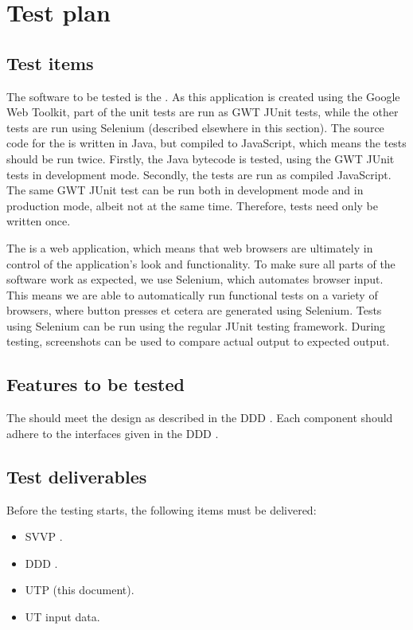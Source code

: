\chapter{Test plan}\label{chap:testPlan}

\section{Test items}
The software to be tested is the \applicationname{}. As this application is created using the Google Web Toolkit, part of the unit tests are run as GWT JUnit tests, while the other tests are run using Selenium (described elsewhere in this section). The source code for the \applicationname{} is written in Java, but compiled to JavaScript, which means the tests should be run twice. Firstly, the Java bytecode is tested, using the GWT JUnit tests in development mode. Secondly, the tests are run as compiled JavaScript. The same GWT JUnit test can be run both in development mode and in production mode, albeit not at the same time. Therefore, tests need only be written once.

The \applicationname{} is a web application, which means that web browsers are ultimately in control of the application's look and functionality. To make sure all parts of the software work as expected, we use Selenium, which automates browser input. This means we are able to automatically run functional tests on a variety of browsers, where button presses et cetera are generated using Selenium. Tests using Selenium can be run using the regular JUnit testing framework. During testing, screenshots can be used to compare actual output to expected output.

\section{Features to be tested}
The \applicationname{} should meet the design as described in the DDD \cite{ddd}. Each component should adhere to the interfaces given in the DDD \cite{ddd}.

\section{Test deliverables}
Before the testing starts, the following items must be delivered:

\begin{itemize}
  \item SVVP \cite{svvp}.
  \item DDD \cite{ddd}.
  \item UTP (this document).
  \item UT input data.
\end{itemize}

